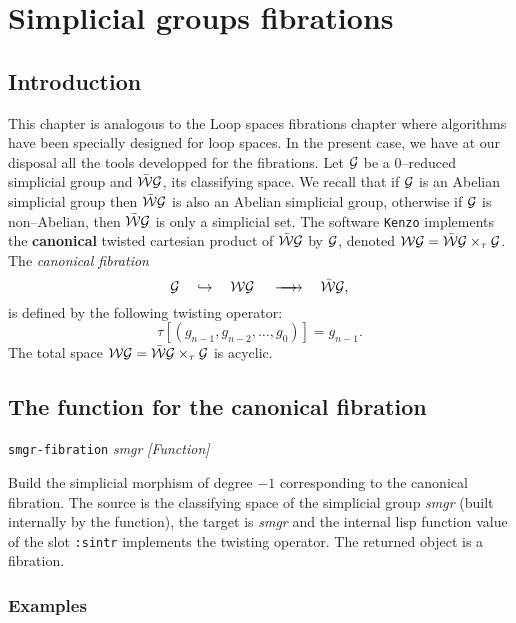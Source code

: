 \chapter {Simplicial groups fibrations}

\section {Introduction}

This chapter is analogous to the  Loop spaces fibrations chapter
where  algorithms have been specially designed for loop spaces. In the present case, we have at our
disposal all the tools developped for the fibrations. Let ${\cal G}$
be a $0$--reduced simplicial group and $\bar{\cal W}{\cal G}$, its
classifying space.  We recall that if ${\cal G}$ is
an Abelian simplicial group then $\bar{\cal W}{\cal G}$ is also an Abelian
simplicial group, otherwise if ${\cal G}$ is non--Abelian, then $\bar{\cal W}{\cal G}$
is only a simplicial set. The software {\tt Kenzo} implements the
{\bf canonical} twisted cartesian product of $\bar{\cal W}{\cal G}$ by  ${\cal G}$,
denoted ${\cal WG}=\bar{\cal W}{\cal G} \times_\tau  {\cal G}$.
The {\em canonical fibration}
$$ {\cal G}\quad \hookrightarrow\quad  {\cal WG} \hskip 1.2em \longrightarrow \hskip -1.2em \longrightarrow
   \quad\bar{\cal W}{\cal G},$$
is defined by the following twisting operator:
$$\tau[(g_{n-1}, g_{n-2}, \ldots, g_0)]= g_{n-1}.$$
The total space ${\cal WG}=\bar{\cal W}{\cal G} \times_\tau  {\cal G}$ is acyclic.

\section {The function for the canonical fibration}

{\parindent=0mm
{\leftskip=5mm
{\tt smgr-fibration} {\em smgr} \hfill {\em [Function]} \par}
{\leftskip=15mm
Build the simplicial morphism of degree $-1$ corresponding to the canonical fibration.
The source is the classifying space of the simplicial group {\em smgr}
(built internally by the function), the target
is {\em smgr} and the internal lisp function value of the slot {\tt :sintr} implements
the twisting operator. The returned object is a fibration. \par}
}

\subsection* {Examples}

